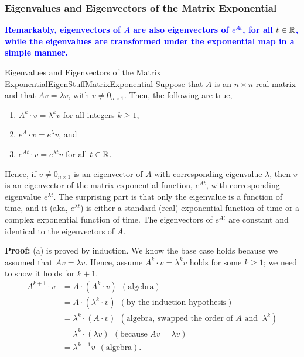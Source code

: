 \subsubsection{Eigenvalues and Eigenvectors of the Matrix Exponential}

\textcolor{blue}{\bf Remarkably, eigenvectors of $A$ are also eigenvectors of $e^{At}$, for all $t\in \mathbb R$, while the eigenvalues are transformed under the exponential map in a simple manner.} 

\bigskip

\begin{propColor}{Eigenvalues and Eigenvectors of the Matrix Exponential}{EigenStuffMatrixExponential}
Suppose that $A$ is an $n \times n$ real matrix and that $Av = \lambda v$, with $v\neq 0_{n \times 1}$. Then, the following are true,
 \begin{enumerate}
\renewcommand{\labelenumi}{(\alph{enumi})}
\setlength{\itemsep}{.2cm}
    \item $A^k \cdot v = \lambda^k v$ for all integers $k \ge 1$, 
    \item $e^{A} \cdot v = e^{\lambda} v$, and
    \item $e^{A t} \cdot v = e^{\lambda t} v$ for all $t \in \mathbb R$.
\end{enumerate} 
Hence, if $v\neq 0_{n \times 1}$ is an eigenvector of $A$ with corresponding eigenvalue $\lambda$, then $v$ is an eigenvector of the matrix exponential function, $e^{At}$, with corresponding eigenvalue $e^{\lambda t}$. The surprising part is that only the eigenvalue is a function of time, and it (aka, $e^{\lambda t}$) is either a standard (real) exponential function of time or a complex exponential function of time. The eigenvectors of $e^{At}$ are constant and identical to the eigenvectors of $A$.
\end{propColor}

\bigskip
\textbf{Proof:} (a) is proved by induction. We know the base case holds because we assumed that $Av = \lambda v$. Hence, assume $A^k \cdot v = \lambda^k v$ holds for some $k\ge 1$; we need to show it holds for $k+1$. 
\begin{align*}
    A^{k+1} \cdot v &= A \cdot \left(A^k \cdot v \right)  ~~(\text{algebra}) \\
   &=  A \cdot \left(\lambda^k \cdot v \right) ~~(\text{by the induction hypothesis}) \\
    &= \lambda^k \cdot \left( A\cdot v \right) ~~(\text{algebra, swapped the order of } A \text{ and } ~\lambda^k) \\
    &= \lambda^k \cdot \left( \lambda v \right) ~~(\text{because }Av = \lambda v) \\
    & =  \lambda^{k+1} v   ~~(\text{algebra}).
\end{align*}

